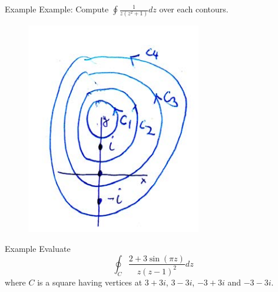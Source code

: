 \documentclass[11pt]{beamer}
\theoremstyle{plain}
\begin{document}
\begin{frame}{Example}
    Example: Compute $\oint \frac{1}{z(z^2+1)}dz$ over each contours.
    \begin{figure}
        \centering
        \includegraphics[width=0.5\linewidth]{Screenshot 2025-09-11 012149.png}
    \end{figure}
\end{frame}
\begin{frame}{Example}
    Evaluate $$\oint_C \frac{2+3\sin(\pi z)}{z(z-1)^2}dz$$
    where $C$ is a square having vertices at $3+3i$, $3-3i$, $-3+3i$ and $-3-3i$.
\end{frame}
\end{document}
